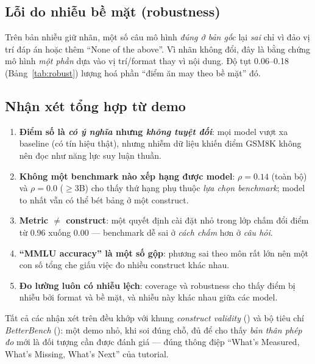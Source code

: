 \subsection{Lỗi do nhiễu bề mặt (robustness)}

Trên bản nhiễu giữ nhãn, một số câu mô hình \emph{đúng ở bản gốc} lại \emph{sai} chỉ
vì đảo vị trí đáp án hoặc thêm ``None of the above''. Vì nhãn không đổi, đây là bằng
chứng mô hình \emph{một phần} dựa vào vị trí/format thay vì nội dung. Độ tụt
0.06--0.18 (Bảng~\ref{tab:robust}) lượng hoá phần ``điểm ăn may theo bề mặt'' đó.

\subsection{Nhận xét tổng hợp từ demo}

\begin{enumerate}
  \item \textbf{Điểm số là \emph{có ý nghĩa} nhưng \emph{không tuyệt đối}}: mọi
    model vượt xa baseline (có tín hiệu thật), nhưng nhiễm dữ liệu khiến điểm GSM8K
    không nên đọc như năng lực suy luận thuần.
  \item \textbf{Không một benchmark nào xếp hạng được model}: $\rho = 0.14$
    (toàn bộ) và $\rho = 0.0$ ($\geq 3$B) cho thấy thứ hạng phụ thuộc \emph{lựa
    chọn benchmark}; model to nhất vẫn có thể bét bảng ở một construct.
  \item \textbf{Metric $\neq$ construct}: một quyết định cài đặt nhỏ trong lớp chấm
    đổi điểm từ 0.96 xuống 0.00 --- benchmark dễ sai ở \emph{cách chấm} hơn ở
    \emph{câu hỏi}.
  \item \textbf{``MMLU accuracy'' là một số gộp}: phương sai theo môn rất lớn nên
    một con số tổng che giấu việc đo nhiều construct khác nhau.
  \item \textbf{Đo lường luôn có nhiễu lệch}: coverage và robustness cho thấy điểm
    bị nhiễu bởi format và bề mặt, và nhiễu này khác nhau giữa các model.
\end{enumerate}

Tất cả các nhận xét trên đều khớp với khung \emph{construct validity}
(\cite{measuring_what_matters}) và bộ tiêu chí \emph{BetterBench}
(\cite{betterbench}): một demo nhỏ, khi soi đúng chỗ, đủ để cho thấy
\emph{bản thân phép đo} mới là đối tượng cần được đánh giá --- đúng thông điệp
``What's Measured, What's Missing, What's Next'' của tutorial.
